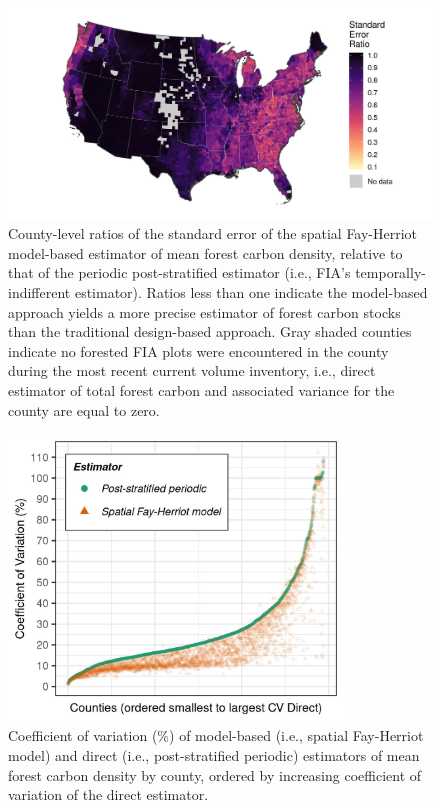 \documentclass[11pt]{article}
\begin{document}
\begin{figure}[t!]
    \centering
    \includegraphics[width=6in]{figure2.jpg}
    \caption{County-level ratios of the standard error of the spatial Fay-Herriot model-based estimator of mean forest carbon density, relative to that of the periodic post-stratified estimator (i.e., FIA's temporally-indifferent estimator). Ratios less than one indicate the model-based approach yields a more precise estimator of forest carbon stocks than the traditional design-based approach. Gray shaded counties indicate no forested FIA plots were encountered in the county during the most recent current volume inventory, i.e., direct estimator of total forest carbon and associated variance for the county are equal to zero.}
    \label{fig:error}
\end{figure}

\begin{figure}[t!]
    \centering
    \includegraphics[width=3.5in]{figure3.jpg}
    \caption{Coefficient of variation (\%) of model-based (i.e., spatial Fay-Herriot model) and direct (i.e., post-stratified periodic) estimators of mean forest carbon density by county, ordered by increasing coefficient of variation of the direct estimator.}
    \label{fig:carbon_cv}
\end{figure}
\end{document}

